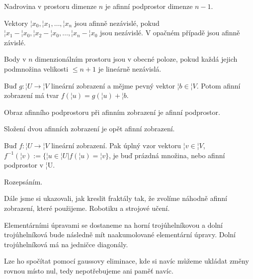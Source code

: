\documentclass[12pt]{article}					%
\begin{document}
    \begin{definice}[Nadrovina]
        Nadrovina v prostoru dimenze $n$ je afinní podprostor dimenze $n - 1$.
    \end{definice}

    \begin{definice}
        Vektory $¦x_0, ¦x_1, …, ¦x_n$ jsou afinně nezávislé, pokud $¦x_1 - ¦x_0, ¦x_2 - ¦x_0, …, ¦x_n - ¦x_0$ jsou nezávislé. V opačném případě jsou afinně závislé.
    \end{definice}

    \begin{poznamka}
        Body v $n$ dimenzionálním prostoru jsou v obecné poloze, pokud každá jejich podmnožina velikosti $≤n+1$ je lineárně nezávislá.
    \end{poznamka}

    \begin{definice}
        Buď $g: ¦U \rightarrow ¦V$ lineární zobrazení a mějme pevný vektor $¦b \in ¦V$. Potom afinní zobrazení má tvar $f(¦u) = g(¦u) + ¦b$.
    \end{definice}

    \begin{tvrzeni}
        Obraz afinního podprostoru při afinním zobrazení je afinní podprostor.

        Složení dvou afinních zobrazení je opět afinní zobrazení.
    \end{tvrzeni}

    \begin{tvrzeni}
        Buď $f: ¦U \rightarrow ¦V$ lineární zobrazení. Pak úplný vzor vektoru $¦v \in ¦V$, $f^{-1}(¦v) := \{¦u \in ¦U| f(¦u) = ¦v\}$, je buď prázdná množina, nebo afinní podprostor v ¦U.

        \begin{dukazin}
            Rozepsáním.
        \end{dukazin}
    \end{tvrzeni}

    \begin{poznamka}
        Dále jsme si ukazovali, jak kreslit fraktály tak, že zvolíme náhodně afinní zobrazení, které použijeme. Robotiku a strojové učení.
    \end{poznamka}


    \begin{definice}[LU rozklad]
        Elementárními úpravami se dostaneme na horní trojúhelníkovou a dolní trojúhelníková bude následně mít naakumolované elementární úpravy. Dolní trojúhelníková má na jedničce diagonály.

        Lze ho spočítat pomocí gaussovy eliminace, kde si navíc můžeme ukládat změny rovnou místo nul, tedy nepotřebujeme ani paměť navíc.
    \end{definice}
\end{document}
